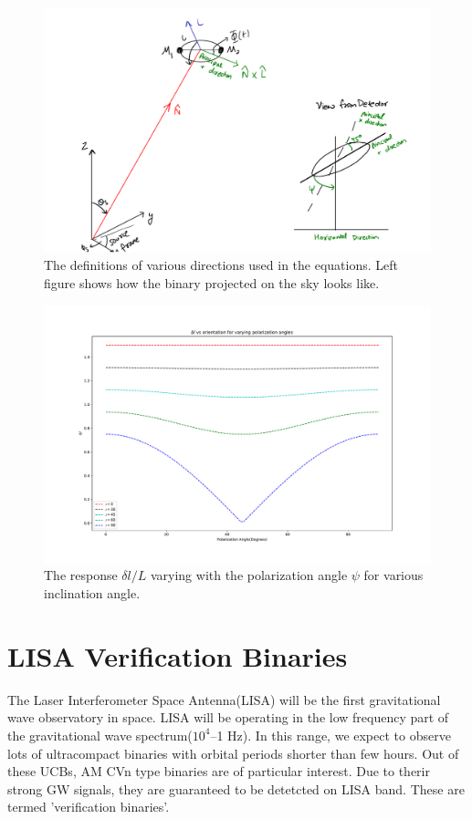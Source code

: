 \documentclass[10pt,a4paper]{article}
\begin{document}
\begin{figure}[!h]
\centering
\includegraphics[scale=0.6]{../Figures/directions.pdf}
\caption{The definitions of various directions used in the equations. Left figure shows how the binary projected on the sky looks like.\label{fig:directions}}
\end{figure}

\begin{figure}[!h]
\centering
\includegraphics[scale=0.3]{../Figures/responsevsorientationofbinary.pdf}
\caption{The response $\delta l/L$ varying with the polarization
  angle $\psi$ for various inclination angle.\label{fig:resporient}}
\end{figure}

\newpage
\section*{LISA Verification Binaries}
The Laser Interferometer Space Antenna(LISA) will be the first gravitational wave observatory in space. LISA will be operating in the low frequency part of the gravitational wave spectrum($10^4$--1 Hz). In this range, we expect to observe lots of ultracompact binaries with orbital periods shorter than few hours. Out of these UCBs, AM CVn type binaries are of particular interest. Due to therir strong GW signals, they are guaranteed to be  detetcted on LISA band. These are termed 'verification binaries'.
\end{document}
